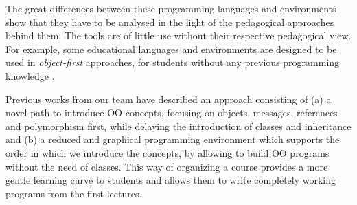 \medskip 





The great differences between these programming languages and environments show that they have to be analysed in the light of the pedagogical approaches behind them.
The tools are of little use without their respective pedagogical view.
For example, some educational languages and environments are designed to be used in \textit{object-first} approaches, 
\ie for students without any previous programming knowledge \cite{arnow_introduction_1998, bruce_library_2001}.

\medskip
Previous works from our team \cite{lombardi_instances_2007,lombardi_carlos_alumnos_2008,griggio_programming_2011,spigariol_lucas_ensenando_2013} have described an approach consisting of
(a) a novel path to introduce OO concepts, focusing on objects, messages, references and polymorphism first, while delaying the introduction of classes and inheritance and 
(b) a reduced and graphical programming environment which supports the order in which we introduce the concepts, by allowing to build OO programs without the need of classes.
This way of organizing a course provides a more gentle learning curve to students and allows them to write completely working programs from the first lectures.

